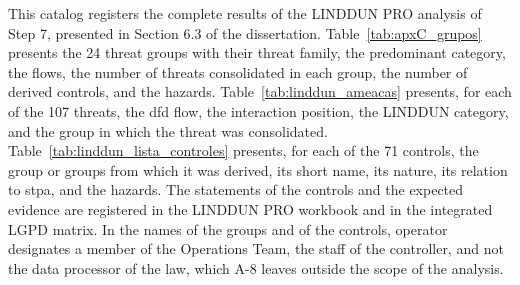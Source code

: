 \label{apx:linddun}

This catalog registers the complete results of the LINDDUN PRO analysis of Step 7, presented in Section 6.3 of the dissertation. Table~\ref{tab:apxC_grupos} presents the 24 threat groups with their threat family, the predominant category, the flows, the number of threats consolidated in each group, the number of derived controls, and the hazards. Table~\ref{tab:linddun_ameacas} presents, for each of the 107 threats, the \gls{dfd} flow, the interaction position, the LINDDUN category, and the group in which the threat was consolidated. Table~\ref{tab:linddun_lista_controles} presents, for each of the 71 controls, the group or groups from which it was derived, its short name, its nature, its relation to \gls{stpa}, and the hazards. The statements of the controls and the expected evidence are registered in the LINDDUN PRO workbook and in the integrated LGPD matrix. In the names of the groups and of the controls, operator designates a member of the Operations Team, the staff of the controller, and not the data processor of the law, which A-8 leaves outside the scope of the analysis.

